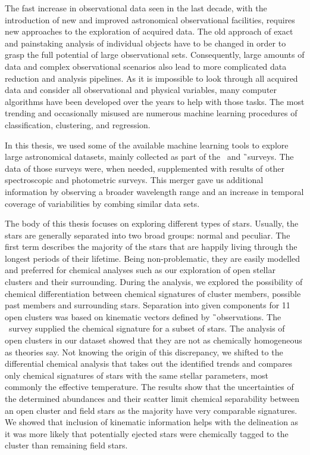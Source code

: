 The fast increase in observational data seen in the last decade, with the introduction of new and improved astronomical observational facilities, requires new approaches to the exploration of acquired data. The old approach of exact and painstaking analysis of individual objects have to be changed in order to grasp the full potential of large observational sets. Consequently, large amounts of data and complex observational scenarios also lead to more complicated data reduction and analysis pipelines. As it is impossible to look through all acquired data and consider all observational and physical variables, many computer algorithms have been developed over the years to help with those tasks. The most trending and occasionally misused are numerous machine learning procedures of classification, clustering, and regression.

In this thesis, we used some of the available machine learning tools to explore large astronomical datasets, mainly collected as part of the \Gh\ and \G\ surveys. The data of those surveys were, when needed, supplemented with results of other spectroscopic and photometric surveys. This merger gave us additional information by observing a broader wavelength range and an increase in temporal coverage of variabilities by combing similar data sets.

The body of this thesis focuses on exploring different types of stars. Usually, the stars are generally separated into two broad groups: normal and peculiar. The first term describes the majority of the stars that are happily living through the longest periods of their lifetime. Being non-problematic, they are easily modelled and preferred for chemical analyses such as our exploration of open stellar clusters and their surrounding. During the analysis, we explored the possibility of chemical differentiation between chemical signatures of cluster members, possible past members and surrounding stars. Separation into given components for 11 open clusters was based on kinematic vectors defined by \G\ observations. The \Gh\ survey supplied the chemical signature for a subset of stars. The analysis of open clusters in our dataset showed that they are not as chemically homogeneous as theories say. Not knowing the origin of this discrepancy, we shifted to the differential chemical analysis that takes out the identified trends and compares only chemical signatures of stars with the same stellar parameters, most commonly the effective temperature. The results show that the uncertainties of the determined abundances and their scatter limit chemical separability between an open cluster and field stars as the majority have very comparable signatures. We showed that inclusion of kinematic information helps with the delineation as it was more likely that potentially ejected stars were chemically tagged to the cluster than remaining field stars.


